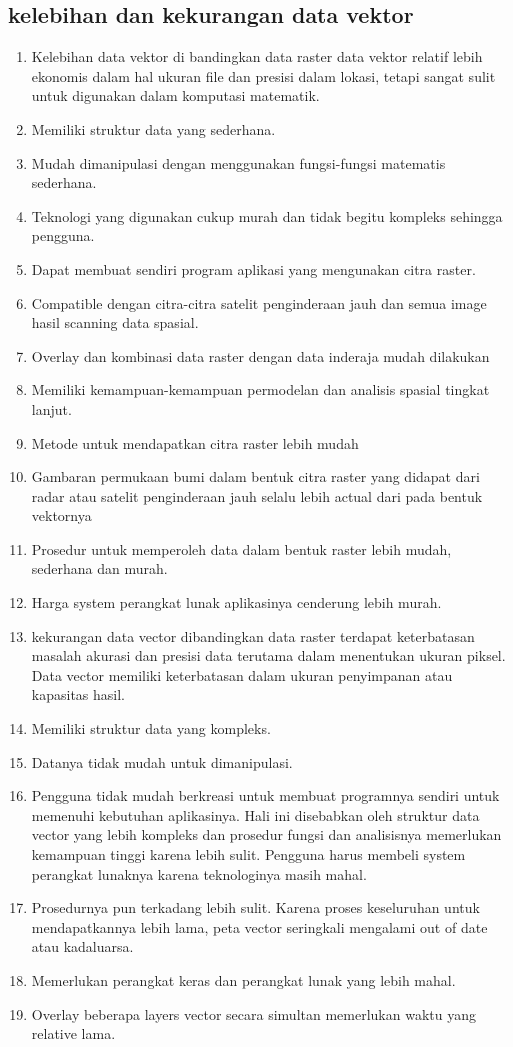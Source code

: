 \subsection{kelebihan dan kekurangan data vektor}
\begin{enumerate}
\item
Kelebihan data vektor di bandingkan data raster
data vektor relatif lebih ekonomis dalam hal ukuran file dan presisi dalam lokasi, tetapi sangat sulit untuk digunakan dalam komputasi matematik. 
\item Memiliki struktur data yang sederhana.
\item Mudah dimanipulasi dengan menggunakan fungsi-fungsi matematis sederhana.
\item Teknologi yang digunakan cukup murah dan tidak begitu kompleks sehingga pengguna.
\item Dapat membuat sendiri program aplikasi yang mengunakan citra raster.
\item Compatible dengan citra-citra satelit penginderaan jauh dan semua image hasil scanning data spasial.
\item Overlay dan kombinasi data raster dengan data inderaja mudah dilakukan
\item Memiliki kemampuan-kemampuan permodelan dan analisis spasial tingkat lanjut.
\item Metode untuk mendapatkan citra raster lebih mudah
\item Gambaran permukaan bumi dalam bentuk citra raster yang didapat dari radar atau satelit penginderaan jauh selalu lebih actual dari pada bentuk vektornya
\item Prosedur untuk memperoleh data dalam bentuk raster lebih mudah, sederhana dan murah.
\item Harga system perangkat lunak aplikasinya cenderung lebih murah.

\item
kekurangan data vector dibandingkan data raster
terdapat keterbatasan masalah akurasi dan presisi data terutama dalam menentukan ukuran piksel. Data vector memiliki keterbatasan dalam ukuran penyimpanan atau kapasitas hasil.
\item Memiliki struktur data yang kompleks.
\item Datanya tidak mudah untuk dimanipulasi.
\item Pengguna tidak mudah berkreasi untuk membuat programnya sendiri untuk memenuhi kebutuhan aplikasinya. Hali ini disebabkan oleh struktur data vector yang lebih kompleks dan prosedur fungsi dan analisisnya memerlukan kemampuan tinggi karena lebih sulit. Pengguna harus membeli system perangkat lunaknya karena teknologinya masih mahal.
\item Prosedurnya pun terkadang lebih sulit. Karena proses keseluruhan untuk mendapatkannya lebih lama, peta vector seringkali mengalami out of date atau kadaluarsa.
\item Memerlukan perangkat keras dan perangkat lunak yang lebih mahal.
\item Overlay beberapa layers vector secara simultan memerlukan waktu yang relative lama.
\end{enumerate}


